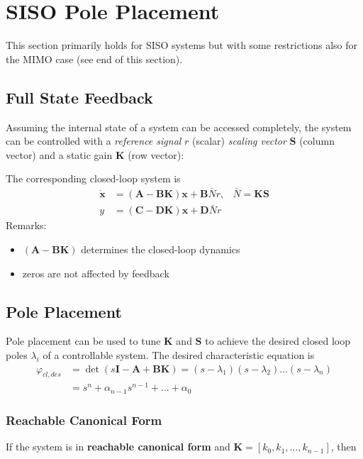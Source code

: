 \section{SISO Pole Placement}
This section primarily holds for SISO systems but with some restrictions also for the MIMO case (see end of this section).
\subsection{Full State Feedback}
Assuming the internal state of a system can be accessed completely, the system can be controlled
with a \textit{reference signal} $r$ (scalar) \textit{scaling vector} $\mathbf{S}$ (column vector) and a static gain $\mathbf{K}$ (row vector):
\begin{center}
    
\end{center}
The corresponding closed-loop system is
\noindent\begin{align*}
    \dot{\mathbf{x}} & =(\mathbf{A}-\mathbf{BK})\mathbf{x}+\mathbf{B}\bar{N}r, & \bar{N}=\mathbf{KS} \\
    y                & =(\mathbf{C}-\mathbf{DK})\mathbf{x} +\mathbf{D}\bar{N}r
\end{align*}
Remarks:
\begin{itemize}
    \item $(\mathbf{A}-\mathbf{BK})$ determines the closed-loop dynamics
    \item zeros are not affected by feedback
\end{itemize}

\subsection{Pole Placement}\label{sec:pole_placement}
Pole placement can be used to tune $\mathbf{K}$ and $\mathbf{S}$ to achieve the desired closed loop poles $\lambda_i$ of a controllable system.
The desired characteristic equation is
\noindent\begin{align*}
    \varphi_{cl,des} & =\det{(s\mathbf{I}-\mathbf{A}+\mathbf{BK})}=(s-\lambda_1)(s-\lambda_2)\ldots(s-\lambda_n) \\
                     & =s^n+\alpha_{n-1}s^{n-1}+\ldots+\alpha_0
\end{align*}

\subsubsection{Reachable Canonical Form}
If the system is in \textbf{reachable canonical form} and $\mathbf{K} = \left[k_0,k_1,\ldots,k_{n-1}\right]$, then

